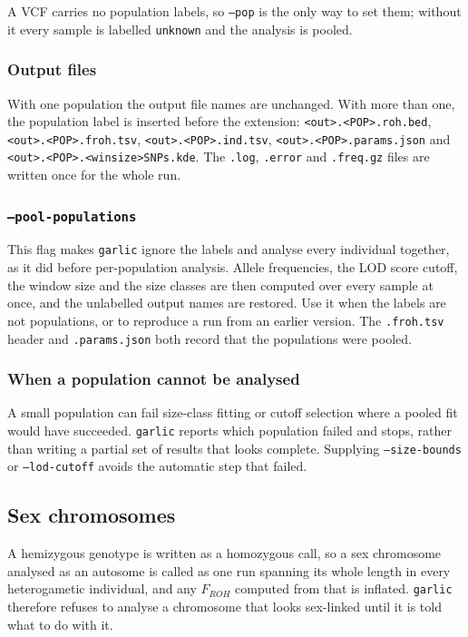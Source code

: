 \documentclass[12pt]{article}%
\begin{document}
A VCF carries no population labels, so {\tt --pop} is the only way to set them;
without it every sample is labelled {\tt unknown} and the analysis is pooled.

\subsubsection{Output files}

With one population the output file names are unchanged.  With more than one,
the population label is inserted before the extension:
{\tt <out>.<POP>.roh.bed}, {\tt <out>.<POP>.froh.tsv}, {\tt <out>.<POP>.ind.tsv},
{\tt <out>.<POP>.params.json} and {\tt <out>.<POP>.<winsize>SNPs.kde}.  The
{\tt .log}, {\tt .error} and {\tt .freq.gz} files are written once for the
whole run.

\subsubsection{{\tt --pool-populations}}

This flag makes {\tt garlic} ignore the labels and analyse every individual
together, as it did before per-population analysis.  Allele frequencies, the
LOD score cutoff, the window size and the size classes are then computed over
every sample at once, and the unlabelled output names are restored.  Use it
when the labels are not populations, or to reproduce a run from an earlier
version.  The {\tt .froh.tsv} header and {\tt .params.json} both record that
the populations were pooled.

\subsubsection{When a population cannot be analysed}

A small population can fail size-class fitting or cutoff selection where a
pooled fit would have succeeded.  {\tt garlic} reports which population failed
and stops, rather than writing a partial set of results that looks complete.
Supplying {\tt --size-bounds} or {\tt --lod-cutoff} avoids the automatic step
that failed.

\subsection{Sex chromosomes}
\label{sec:sexchr}

A hemizygous genotype is written as a homozygous call, so a sex chromosome
analysed as an autosome is called as one run spanning its whole length in
every heterogametic individual, and any $F_{ROH}$ computed from that is
inflated.  {\tt garlic} therefore refuses to analyse a chromosome that looks
sex-linked until it is told what to do with it.
\end{document}
